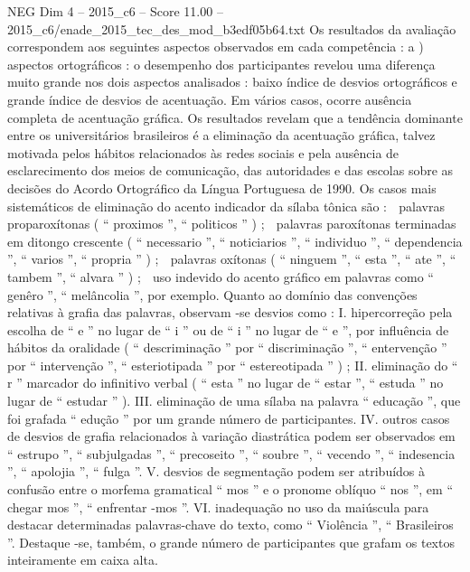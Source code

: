 \begin{textsample}{NEG Dim 4 – 2015\_c6 – Score 11.00 – 2015\_c6/enade\_2015\_tec\_des\_mod\_b3edf05b64.txt}
Os resultados da avaliação correspondem aos seguintes aspectos observados em cada competência : a ) aspectos ortográficos : o desempenho dos participantes revelou uma diferença muito grande nos dois aspectos analisados : baixo índice de desvios ortográficos e grande índice de desvios de acentuação.
Em vários casos, ocorre ausência completa de acentuação gráfica.
Os resultados revelam que a tendência dominante entre os universitários brasileiros é a eliminação da acentuação gráfica, talvez motivada pelos hábitos relacionados às redes sociais e pela ausência de esclarecimento dos meios de comunicação, das autoridades e das escolas sobre as decisões do Acordo Ortográfico da Língua Portuguesa de 1990.
Os casos mais sistemáticos de eliminação do acento indicador da sílaba tônica são :  palavras proparoxítonas ( “ proximos ”, “ politicos ” ) ;  palavras paroxítonas terminadas em ditongo crescente ( “ necessario ”, “ noticiarios ”, “ individuo ”, “ dependencia ”, “ varios ”, “ propria ” ) ;  palavras oxítonas ( “ ninguem ”, “ esta ”, “ ate ”, “ tambem ”, “ alvara ” ) ;  uso indevido do acento gráfico em palavras como “ genêro ”, “ melâncolia ”, por exemplo.
Quanto ao domínio das convenções relativas à grafia das palavras, observam -se desvios como : I. hipercorreção pela escolha de “ e ” no lugar de “ i ” ou de “ i ” no lugar de “ e ”, por influência de hábitos da oralidade ( “ descriminação ” por “ discriminação ”, “ entervenção ” por “ intervenção ”, “ esteriotipada ” por “ estereotipada ” ) ; II. eliminação do “ r ” marcador do infinitivo verbal ( “ esta ” no lugar de “ estar ”, “ estuda ” no lugar de “ estudar ” ).
III. eliminação de uma sílaba na palavra “ educação ”, que foi grafada “ edução ” por um grande número de participantes.
IV. outros casos de desvios de grafia relacionados à variação diastrática podem ser observados em “ estrupo ”, “ subjulgadas ”, “ precoseito ”, “ soubre ”, “ vecendo ”, “ indesencia ”, “ apolojia ”, “ fulga ”.
V. desvios de segmentação podem ser atribuídos à confusão entre o morfema gramatical “ mos ” e o pronome oblíquo “ nos ”, em “ chegar mos ”, “ enfrentar -mos ”.
VI. inadequação no uso da maiúscula para destacar determinadas palavras-chave do texto, como “ Violência ”, “ Brasileiros ”.
Destaque -se, também, o grande número de participantes que grafam os textos inteiramente em caixa alta.

\end{textsample}
